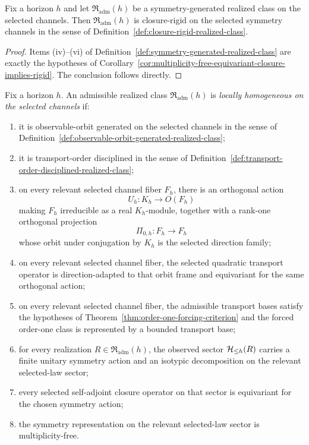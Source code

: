 \begin{corollary}
\label{cor:symmetry-generated-implies-closure-rigid}
Fix a horizon $h$ and let $\mathfrak R_{\mathrm{adm}}(h)$ be a
symmetry-generated realized class on the selected channels. Then
$\mathfrak R_{\mathrm{adm}}(h)$ is closure-rigid on the selected symmetry
channels in the sense of
Definition~\ref{def:closure-rigid-realized-class}.
\end{corollary}

\begin{proof}
Items (iv)--(vi) of Definition~\ref{def:symmetry-generated-realized-class}
are exactly the hypotheses of
Corollary~\ref{cor:multiplicity-free-equivariant-closure-implies-rigid}.
The conclusion follows directly.
\end{proof}

\begin{definition}
\label{def:locally-homogeneous-realized-class}
Fix a horizon $h$. An admissible realized class
$\mathfrak R_{\mathrm{adm}}(h)$ is \emph{locally homogeneous on the selected
channels} if:
\begin{enumerate}[label=(\roman*), leftmargin=2em, itemsep=0.2em]
\item it is observable-orbit generated on the selected channels in the sense
      of Definition~\ref{def:observable-orbit-generated-realized-class};
\item it is transport-order disciplined in the sense of
      Definition~\ref{def:transport-order-disciplined-realized-class};
\item on every relevant selected channel fiber $F_h$, there is an orthogonal
      action
      \[
      U_h:K_h\to O(F_h)
      \]
      making $F_h$ irreducible as a real $K_h$-module, together with a
      rank-one orthogonal projection
      \[
      \Pi_{0,h}:F_h\to F_h
      \]
      whose orbit under conjugation by $K_h$ is the selected direction family;
\item on every relevant selected channel fiber, the selected quadratic
      transport operator is direction-adapted to that orbit frame and
      equivariant for the same orthogonal action;
\item on every relevant selected channel fiber, the admissible transport bases
      satisfy the hypotheses of
      Theorem~\ref{thm:order-one-forcing-criterion} and the forced order-one
      class is represented by a bounded transport base;
\item for every realization $R\in\mathfrak R_{\mathrm{adm}}(h)$, the observed
      sector $\mathcal{H}_{\le h}(R)$ carries a finite unitary symmetry action and an
      isotypic decomposition on the relevant selected-law sector;
\item every selected self-adjoint closure operator on that sector is
      equivariant for the chosen symmetry action;
\item the symmetry representation on the relevant selected-law sector is
      multiplicity-free.
\end{enumerate}
\end{definition}

